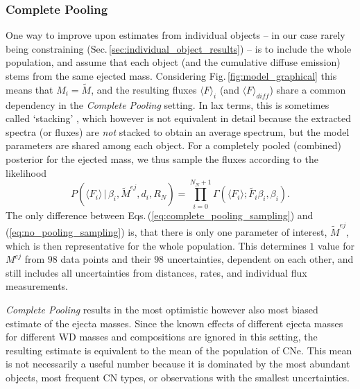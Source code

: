 \documentclass{aa}
\newcommand{\mrm}[1]{\mathrm{#1}}
\begin{document}
\subsubsection{Complete Pooling}\label{sec:complete_pooling}
%
One way to improve upon estimates from individual objects -- in our case rarely being constraining (Sec.\,\ref{sec:individual_object_results}) -- is to include the whole population, and assume that each object (and the cumulative diffuse emission) stems from the same ejected mass.
%
Considering Fig.\,\ref{fig:model_graphical} this means that $M_i = \tilde{M}$, and the resulting fluxes $\langle F \rangle_i$ (and $\langle F \rangle_{diff}$) share a common dependency in the \textit{Complete Pooling} setting.
%
In lax terms, this is sometimes called `stacking' \citep[e.g.,][]{Malz2021_notstacking}, which however is not equivalent in detail because the extracted spectra (or fluxes) are \textit{not} stacked to obtain an average spectrum, but the model parameters are shared among each object.
%
For a completely pooled (combined) posterior for the ejected mass, we thus sample the fluxes according to the likelihood
%
\begin{equation}
	P( \langle F_i \rangle\, | \,\beta_i, \tilde{M}^{ej}, d_i, R_N) = \prod_{i=0}^{N_N+1} \Gamma(\langle F_i \rangle ; \tilde{F_i}\beta_i,\beta_i)\mrm{.}
	\label{eq:complete_pooling_sampling}
\end{equation}
%
The only difference between Eqs.\,(\ref{eq:complete_pooling_sampling}) and (\ref{eq:no_pooling_sampling}) is, that there is only one parameter of interest, $\tilde{M}^{ej}$, which is then representative for the whole population.
%
This determines $1$ value for $M^{ej}$ from $98$ data points and their $98$ uncertainties, dependent on each other, and still includes all uncertainties from distances, rates, and individual flux measurements.

\textit{Complete Pooling} results in the most optimistic however also most biased estimate of the ejecta masses.
%
Since the known effects of different ejecta masses for different WD masses and compositions are ignored in this setting, the resulting estimate is equivalent to the mean of the population of CNe.
%
This mean is not necessarily a useful number because it is dominated by the most abundant objects, most frequent CN types, or observations with the smallest uncertainties.
\end{document}
